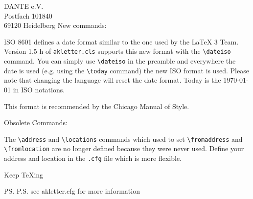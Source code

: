 \documentclass[%
foldmarks,
bankhigh,
banklow,
draft,
refdate,
twoside,
a4paper]
{akletter}
\begin{document}
\begin{letter}{DANTE e.V.\\Postfach 101840\\69120 Heidelberg}
New commands:

ISO 8601 defines a date format similar to the one used by the \LaTeX 
3 Team. Version 1.5 h of \texttt{akletter.cls} supports this new 
format with the \verb+\dateiso+ command. You can simply use 
\verb+\dateiso+ in the preamble and everywhere the date is used (e.g. 
using the \verb+\today+ command) the new ISO format is used. Please 
note that changing the language will reset the date format. Today is 
the {\dateiso\today} in ISO notations.

This format is recommended by the Chicago Manual of Style.

Obsolete Commands:

The \verb|\address| and \verb|\locations| commands which 
used to set \verb|\fromaddress| and \verb|\fromlocation| are no 
longer defined because they were never used. Define your address 
and location in the \verb|.cfg| file which is more flexible.

\closing{Keep \TeX ing}


\ps P.S. see akletter.cfg for more information
\end{letter}


\end{document}
